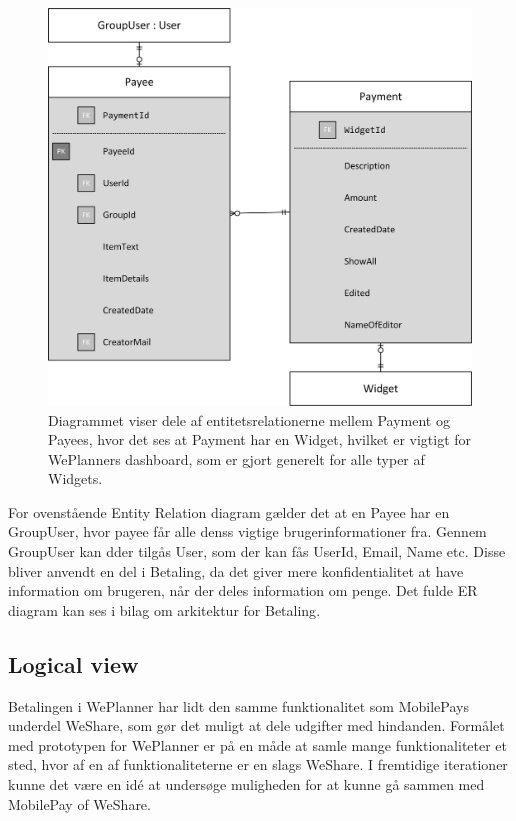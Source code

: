 \begin{figure}[H]
    \centering
    \includegraphics[width=\linewidth]{09_Arkitektur/Payment/Images/partialERDBetaling.png}
    \caption{Diagrammet viser dele af entitetsrelationerne mellem Payment og Payees, hvor det ses at Payment har en Widget, hvilket er vigtigt for WePlanners dashboard, som er gjort generelt for alle typer af Widgets.}
    \label{fig:betalingERD}
\end{figure}

For ovenstående Entity Relation diagram gælder det at en Payee har en GroupUser, hvor payee får alle denss vigtige brugerinformationer fra. Gennem GroupUser kan dder tilgås User, som der kan fås UserId, Email, Name etc. Disse bliver anvendt en del i Betaling, da det giver mere konfidentialitet at have information om brugeren, når der deles information om penge. Det fulde ER diagram kan ses i bilag om arkitektur for Betaling\cite{paymentPartERD}.

\subsection{Logical view}

Betalingen i WePlanner har lidt den samme funktionalitet som MobilePays underdel WeShare\cite{weShare}, som gør det muligt at dele udgifter med hindanden. Formålet med prototypen for WePlanner er på en måde at samle mange funktionaliteter et sted, hvor af en af funktionaliteterne er en slags WeShare. I fremtidige iterationer kunne det være en idé at undersøge muligheden for at kunne gå sammen med MobilePay of WeShare.\\

